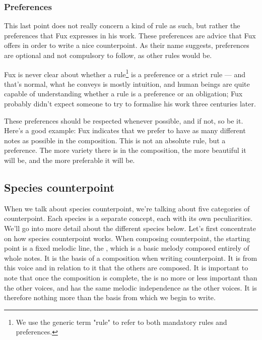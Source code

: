 \subsubsection{Preferences}\label{subsection:preferences-vs-hard-rules}
This last point does not really concern a kind of rule as such, but rather the preferences that Fux expresses in his work. These preferences are advice that Fux offers in order to write a nice counterpoint. As their name suggests, preferences are optional and not compulsory to follow, as other rules would be.

Fux is never clear about whether a rule\footnote{We use the generic term "rule" to refer to both mandatory rules and preferences.} is a preference or a strict rule --- and that's normal, what he conveys is mostly intuition, and human beings are quite capable of understanding whether a rule is a preference or an obligation; Fux probably didn't expect someone to try to formalise his work three centuries later.

These preferences should be respected whenever possible, and if not, so be it. Here's a good example: Fux indicates that we prefer to have as many different notes as possible in the composition. This is not an absolute rule, but a preference. The more variety there is in the composition, the more beautiful it will be, and the more preferable it will be.

\subsection{Species counterpoint}\label{section:species-counterpoint}
When we talk about species counterpoint, we're talking about five categories of counterpoint. Each species is a separate concept, each with its own peculiarities. We'll go into more detail about the different species below. Let's first concentrate on how species counterpoint works. When composing counterpoint, the starting point is a fixed melodic line, the \cf, which is a basic melody composed entirely of whole notes. It is the basis of a composition when writing counterpoint. It is from this voice and in relation to it that the others are composed. It is important to note that once the composition is complete, the \cfs is no more or less important than the other voices, and has the same melodic independence as the other voices. It is therefore nothing more than the basis from which we begin to write.

